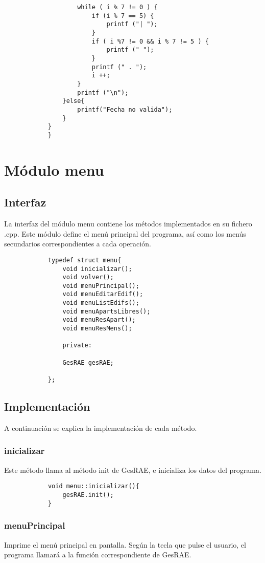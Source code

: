 \documentclass[12pt]{article}
\begin{document}
\begin{lstlisting}
					while ( i % 7 != 0 ) {
						if (i % 7 == 5) {
							printf ("| ");
						}
						if ( i %7 != 0 && i % 7 != 5 ) {
							printf (" ");
						}
						printf (" . ");
						i ++;
					}
					printf ("\n");
				}else{
					printf("Fecha no valida");
				}
			}
			}
		\end{lstlisting}
		
		\section{Módulo menu}
		
		\subsection{Interfaz}
		
		La interfaz del módulo menu contiene los métodos implementados en su fichero .cpp. Este módulo define el menú principal del programa, así como los menús secundarios correspondientes a cada operación.
		
		\begin{lstlisting}
			typedef struct menu{
				void inicializar();
				void volver();
				void menuPrincipal();
				void menuEditarEdif();
				void menuListEdifs();
				void menuApartsLibres();
				void menuResApart();
				void menuResMens();
				
				private:
				
				GesRAE gesRAE;
				
			};	
		\end{lstlisting}
		
		\subsection{Implementación}
		A continuación se explica la implementación de cada método.
		
		\subsubsection{inicializar}
		Este método llama al método init de GesRAE, e inicializa los datos del programa.
		
		\begin{lstlisting}
			void menu::inicializar(){
				gesRAE.init();
			}
		\end{lstlisting}	
		
		\subsubsection{menuPrincipal}
		Imprime el menú principal en pantalla. Según la tecla que pulse el usuario, el programa llamará a la función correspondiente de GesRAE.
		
\end{document}
